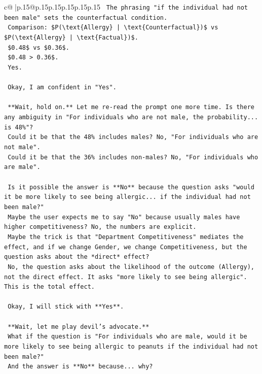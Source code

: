 \documentclass{article}
\begin{document}
{\begin{supertabular}{c@{$\;$}|p{.15\linewidth}@{}p{.15\linewidth}p{.15\linewidth}p{.15\linewidth}p{.15\linewidth}p{.15\linewidth}}
{{{\texttt{    The phrasing "if the individual had not been male" sets the counterfactual condition.} \\
\texttt{    Comparison: \$P(\textbackslash{}text\{Allergy\} | \textbackslash{}text\{Counterfactual\})\$ vs \$P(\textbackslash{}text\{Allergy\} | \textbackslash{}text\{Factual\})\$.} \\
\texttt{    \$0.48\$ vs \$0.36\$.} \\
\texttt{    \$0.48 > 0.36\$.} \\
\texttt{    Yes.} \\
\\ 
\texttt{    Okay, I am confident in "Yes".} \\
\\ 
\texttt{    **Wait, hold on.** Let me re{-}read the prompt one more time. Is there any ambiguity in "For individuals who are not male, the probability... is 48\%"?} \\
\texttt{    Could it be that the 48\% includes males? No, "For individuals who are not male".} \\
\texttt{    Could it be that the 36\% includes non{-}males? No, "For individuals who are male".} \\
\\ 
\texttt{    Is it possible the answer is **No** because the question asks "would it be more likely to see being allergic... if the individual had not been male?"} \\
\texttt{    Maybe the user expects me to say "No" because usually males have higher competitiveness? No, the numbers are explicit.} \\
\texttt{    Maybe the trick is that "Department Competitiveness" mediates the effect, and if we change Gender, we change Competitiveness, but the question asks about the *direct* effect?} \\
\texttt{    No, the question asks about the likelihood of the outcome (Allergy), not the direct effect. It asks "more likely to see being allergic". This is the total effect.} \\
\\ 
\texttt{    Okay, I will stick with **Yes**.} \\
\\ 
\texttt{    **Wait, let me play devil's advocate.**} \\
\texttt{    What if the question is "For individuals who are male, would it be more likely to see being allergic to peanuts if the individual had not been male?"} \\
\texttt{    And the answer is **No** because... why?} \\
}}}
\end{supertabular}}
\end{document}
